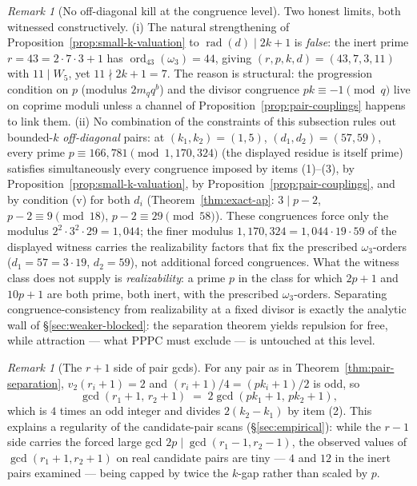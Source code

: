 \documentclass[11pt]{amsart}
\theoremstyle{plain}
\theoremstyle{definition}
\theoremstyle{remark}
\newtheorem{remark}[theorem]{Remark}
\numberwithin{equation}{section}
\newcommand{\ord}{\operatorname{ord}}
\newcommand{\rad}{\operatorname{rad}}
\begin{document}
\begin{remark}[No off-diagonal kill at the congruence level]\label{rem:no-congruence-kill}
Two honest limits, both witnessed constructively. (i) The natural strengthening of Proposition~\ref{prop:small-k-valuation} to $\rad(d) \mid 2k + 1$ is \emph{false}: the inert prime $r = 43 = 2 \cdot 7 \cdot 3 + 1$ has $\ord_{43}(\omega_3) = 44$, giving $(r, p, k, d) = (43, 7, 3, 11)$ with $11 \mid W_5$, yet $11 \nmid 2k + 1 = 7$. The reason is structural: the progression condition on $p$ (modulus $2 m_q q^{b}$) and the divisor congruence $p k \equiv -1 \pmod q$ live on coprime moduli unless a channel of Proposition~\ref{prop:pair-couplings} happens to link them. (ii) No combination of the constraints of this subsection rules out bounded-$k$ \emph{off-diagonal} pairs: at $(k_1, k_2) = (1, 5)$, $(d_1, d_2) = (57, 59)$, every prime $p \equiv 166{,}781 \pmod{1{,}170{,}324}$ (the displayed residue is itself prime) satisfies simultaneously every congruence imposed by items (1)--(3), by Proposition~\ref{prop:small-k-valuation}, by Proposition~\ref{prop:pair-couplings}, and by condition (v) for both $d_i$ (Theorem~\ref{thm:exact-ap}: $3 \mid p - 2$, $p - 2 \equiv 9 \pmod{18}$, $p - 2 \equiv 29 \pmod{58}$). These congruences force only the modulus $2^2 \cdot 3^2 \cdot 29 = 1{,}044$; the finer modulus $1{,}170{,}324 = 1{,}044 \cdot 19 \cdot 59$ of the displayed witness carries the realizability factors that fix the prescribed $\omega_3$-orders ($d_1 = 57 = 3 \cdot 19$, $d_2 = 59$), not additional forced congruences. What the witness class does not supply is \emph{realizability}: a prime $p$ in the class for which $2p + 1$ and $10 p + 1$ are both prime, both inert, with the prescribed $\omega_3$-orders. Separating congruence-consistency from realizability at a fixed divisor is exactly the analytic wall of \S\ref{sec:weaker-blocked}: the separation theorem yields repulsion for free, while attraction --- what PPPC must exclude --- is untouched at this level.
\end{remark}

\begin{remark}[The $r + 1$ side of pair gcds]\label{rem:gcd-rplus1}
For any pair as in Theorem~\ref{thm:pair-separation}, $v_2(r_i + 1) = 2$ and $(r_i + 1)/4 = (p k_i + 1)/2$ is odd, so
\[
  \gcd(r_1 + 1,\, r_2 + 1) \;=\; 2 \gcd(p k_1 + 1,\, p k_2 + 1),
\]
which is $4$ times an odd integer and divides $2 (k_2 - k_1)$ by item (2). This explains a regularity of the candidate-pair scans (\S\ref{sec:empirical}): while the $r - 1$ side carries the forced large gcd $2 p \mid \gcd(r_1 - 1, r_2 - 1)$, the observed values of $\gcd(r_1 + 1, r_2 + 1)$ on real candidate pairs are tiny --- $4$ and $12$ in the inert pairs examined --- being capped by twice the $k$-gap rather than scaled by $p$.
\end{remark}
\end{document}
